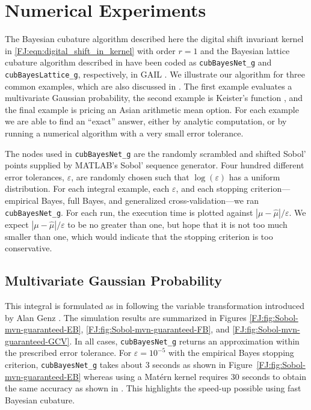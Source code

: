 \documentclass[graybox,footinfo]{svmult}
\newcommand{\abs}[1]{\left\lvert #1 \right\rvert} %
\newcommand{\JRNote}[1]{{\textcolor{green}{JR: #1}}}
\begin{document}
\section{Numerical Experiments}

\label{FJ:sec:NumExp}


The Bayesian cubature algorithm described here the digital shift invariant kernel in \eqref{FJ:eqn:digital_shift_in_kernel} with order $r=1$  and the Bayesian lattice cubature algorithm described in \cite{RatHic19a} have been coded as  \texttt{cubBayesNet\_g} and \texttt{cubBayesLattice\_g}, respectively, in GAIL \cite{ChoEtal21a}.  We illustrate our algorithm for three common examples, which are also discussed in \cite{RatHic19a}.  The first example evaluates a multivariate Gaussian probability, the second example is Keister's function \cite{Kei96}, and the final example is pricing an Asian arithmetic mean option.  For each example we are able to find an ``exact'' answer, either by analytic computation, or by running a numerical algorithm with a very small error tolerance.

The nodes used in \texttt{cubBayesNet\_g} are the randomly scrambled and shifted Sobol' points supplied by MATLAB's Sobol' sequence generator. Four hundred different error tolerances, $\varepsilon$, are randomly chosen such that $\log(\varepsilon)$ has a uniform distribution. 
For each integral example, each $\varepsilon$, and each stopping criterion---empirical Bayes, full Bayes, and generalized cross-validation---we ran \texttt{cubBayesNet\_g}.  For each run, the execution time is plotted against $\abs{\mu - \widehat{\mu}}/\varepsilon$.  We expect $\abs{\mu - \widehat{\mu}}/\varepsilon$ to be no greater than one, but hope that it is not too much smaller than one, which would indicate that the stopping criterion  is too conservative.

\subsection{Multivariate Gaussian Probability}

This integral is formulated as in \cite{RatHic19a} following the variable transformation introduced by Alan Genz \cite{Gen92}. The simulation results are summarized in Figures \ref{FJ:fig:Sobol-mvn-guaranteed-EB}, \ref{FJ:fig:Sobol-mvn-guaranteed-FB}, and \ref{FJ:fig:Sobol-mvn-guaranteed-GCV}.  In all cases, \texttt{cubBayesNet\_g} returns an approximation within the prescribed error tolerance. For  $\varepsilon=10^{-5}$ with the empirical Bayes stopping criterion, \texttt{cubBayesNet\_g} takes about 3 seconds as shown in Figure~\ref{FJ:fig:Sobol-mvn-guaranteed-EB} whereas using a Mat\'ern kernel requires 30 seconds to obtain the same accuracy as shown in \cite{RatHic19a}. This highlights the speed-up possible using fast Bayesian cubature.
\end{document}
